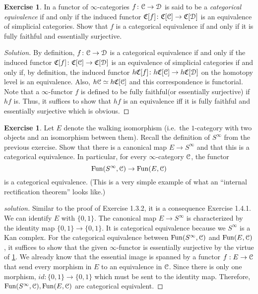 \documentclass[10pt,a4paper,reqno,oneside]{book} %
\theoremstyle{plain}
\theoremstyle{definition}
\newtheorem{exercise}[thm]{Exercise}
\theoremstyle{remark}
\numberwithin{equation}{section}
\begin{document}
\begin{exercise}\label{ex:categorical equivalence}
	In \cite{HTT} a functor of $\infty$-categories $f \colon \mathcal C \to \mathcal D$ is said to be a \emph{categorical equivalence} if and only if the induced functor $\mathfrak C[f] \colon \mathfrak C[\mathcal C] \to \mathfrak C[\mathcal D]$ is an equivalence of simplicial categories.
	Show that $f$ is a categorical equivalence if and only if it is fully faithful and essentially surjective.
\end{exercise}

\ifpersonal
\begin{proof}[Solution]
    By definition, $f \colon \mathcal C \to \mathcal D$ is a categorical equivalence if and only if the induced functor $\mathfrak C[f] \colon \mathfrak C[\mathcal C] \to \mathfrak C[\mathcal D]$ is an equivalence of simplicial categories if and only if, by definition, the induced functor $h\mathfrak C[f] \colon h\mathfrak C[\mathcal C] \to h\mathfrak C[\mathcal D]$ on the homotopy level is an equivalence. Also, $h\mathcal C \simeq h\mathfrak C[\mathcal C]$ and this correspondence is functorial. Note that a $\infty$-functor $f$ is defined to be fully faithful(or essentially surjective) if $hf$ is. Thus, it suffices to show that $hf$ is an equivalence iff it is fully faithful and essentially surjective which is obvious.
\end{proof}
\fi

\begin{exercise} \label{ex: internal rectification}
	Let $E$ denote the walking isomorphism (i.e.\ the $1$-category with two objects and an isomorphism between them).
	Recall the definition of $S^\infty$ from the previous exercise.
	Show that there is a canonical map $E \to S^\infty$ and that this is a categorical equivalence.
	In particular, for every $\infty$-category $\mathcal C$, the functor
	\[ \operatorname{Fun}(S^\infty, \mathcal C) \to \operatorname{Fun}(E, \mathcal C) \]
	is a categorical equivalence.
	(This is a very simple example of what an ``internal rectification theorem'' looks like.)
\end{exercise}

\ifpersonal
\begin{proof}[solution]
    Similar to the proof of Exercise 1.3.2, it is a consequence Exercise 1.4.1. We can identify $E$ with $\{0,1\}$. The canonical map $E \to S^{\infty}$ is characterized by the identity map $\{0,1\} \to \{0,1\}$. It is categorical equivalence because we $S^{\infty}$ is a Kan complex. 
    For the categorical equivalence between $\operatorname{Fun}(S^\infty, \mathcal C)$ and $\operatorname{Fun}(E, \mathcal C)$, it suffices to show that the given $\infty$-functor is essentially surjective by the virtue of \ref{ex:categorical equivalence}. We already know that the essential image is spanned by a functor $f:E \to \mathcal C$ that send every morphism in $E$ to an equivalence in $\mathcal C$. Since there is only one morphism, $id:\{0,1\} \to \{0,1\}$ which must be sent to the identity map. Therefore, $\operatorname{Fun}(S^\infty, \mathcal C), \operatorname{Fun}(E, \mathcal C)$ are categorical equivalent.
\end{proof}
\fi
\end{document}
